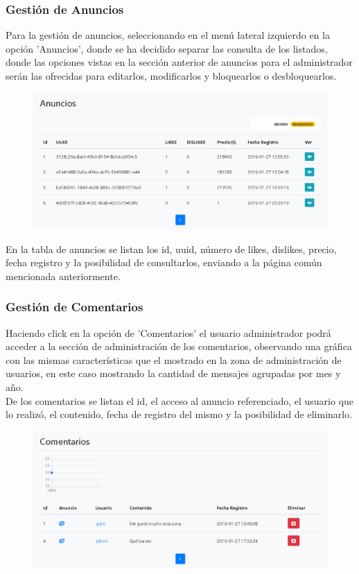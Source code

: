 \subsubsection{Gesti\'{o}n de Anuncios}
Para la gesti\'{o}n de anuncios, seleccionando en el men\'{u} lateral izquierdo en la opci\'{o}n 'Anuncios',  donde se ha decidido separar las consulta de los  listados, donde las opciones vistas en la secci\'{o}n anterior de anuncios para el administrador ser\'{a}n las ofrecidas para editarlos, modificarlos y bloquearlos o desbloquearlos.

\begin{figure}[h!]
\centering
\includegraphics[width=.7\textwidth]{Img/ManualUsuario/ADMIN_ADS_DASHBOARD.png}
\end{figure}

En la tabla de anuncios se listan los id, uuid, n\'{u}mero de likes, dislikes, precio, fecha registro y la posibilidad de consultarlos, enviando a la p\'{a}gina com\'{u}n mencionada anteriormente.



\subsubsection{Gesti\'{o}n de Comentarios}
Haciendo click en la opci\'{o}n de 'Comentarios' el usuario administrador podr\'{a} acceder a la secci\'{o}n de administraci\'{o}n de los comentarios, observando una gr\'{a}fica con las mismas caracter\'{i}sticas que el mostrado en la zona de administraci\'{o}n de usuarios, en este caso mostrando la cantidad de mensajes agrupadas por mes y a\~{n}o. \\

De los comentarios se listan el id, el acceso al anuncio referenciado, el usuario que lo realiz\'{o}, el contenido, fecha de registro del mismo y la posibilidad de eliminarlo.

\begin{figure}[h!]
\centering
\includegraphics[width=.7\textwidth]{Img/ManualUsuario/ADMIN_COMMENT_DASH.png}
\end{figure}



